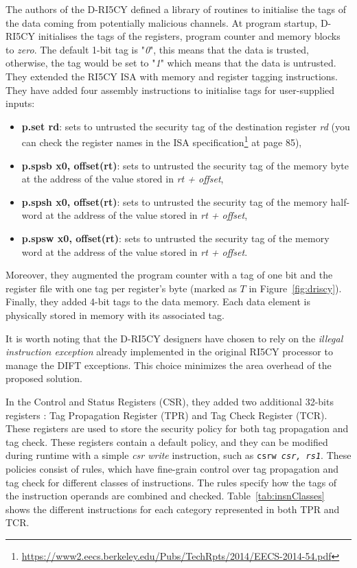 The authors of the D-RI5CY defined a library of routines to initialise the tags of the data coming from potentially malicious channels.
At program startup, D-RI5CY initialises the tags of the registers, program counter and memory blocks to \textit{zero}. The default 1-bit tag is "\textit{0}", this means that the data is trusted, otherwise, the tag would be set to "\textit{1}" which means that the data is untrusted.
They extended the RI5CY ISA with memory and register tagging instructions.
They have added four assembly instructions to initialise tags for user-supplied inputs:
\begin{itemize}
    \item \textbf{p.set rd}: sets to untrusted the security tag of the destination register \textit{rd} (you can check the register names in the ISA specification\footnote{\url{https://www2.eecs.berkeley.edu/Pubs/TechRpts/2014/EECS-2014-54.pdf}} at page 85),
    \item \textbf{p.spsb x0, offset(rt)}: sets to untrusted the security tag of the memory byte at the address of the value stored in \textit{rt + offset},
    \item \textbf{p.spsh x0, offset(rt)}: sets to untrusted the security tag of the memory half-word at the address of the value stored in \textit{rt + offset},
    \item \textbf{p.spsw x0, offset(rt)}: sets to untrusted the security tag of the memory word at the address of the value stored in \textit{rt + offset}.
\end{itemize}


Moreover, they augmented the program counter with a tag of one bit and the register file with one tag per register's byte (marked as $T$ in Figure~\ref{fig:driscy}). Finally, they added 4-bit tags to the data memory.
Each data element is physically stored in memory with its associated tag.

It is worth noting that the D-RI5CY designers have chosen to rely on the \textit{illegal instruction exception} already implemented in the original RI5CY processor to manage the DIFT exceptions. This choice minimizes the area overhead of the proposed solution.

In the Control and Status Registers (CSR), they added two additional 32-bits registers : Tag Propagation Register (TPR) and Tag Check Register (TCR). These registers are used to store the security policy for both tag propagation and tag check. These registers contain a default policy, and they can be modified during runtime with a simple \textit{csr write} instruction, such as \texttt{csrw \textit{csr, rs1}}.
These policies consist of rules, which have fine-grain control over tag propagation and tag check for different classes of instructions. The rules specify how the tags of the instruction operands are combined and checked.
Table~\ref{tab:insnClasses} shows the different instructions for each category represented in both TPR and TCR.

